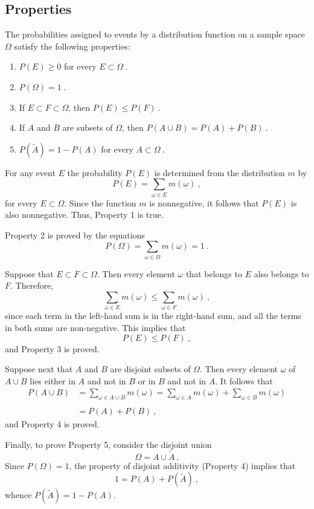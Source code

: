 

\subsection*{Properties}
\nopagebreak
\begin{theorem}\label{thm 1.1}
The probabilities assigned to events by a distribution function on a sample space
$\Omega$ 
satisfy the following properties: 
\begin{enumerate}
\item  $P(E) \geq 0$ for every $E \subset \Omega\ $.
\item  $P(\Omega) = 1\ $.
\item  If $E \subset F \subset \Omega$, then $P(E) \leq P(F)\ $.
\item  If $A$ and $B$ are  subsets of $\Omega$, then $P(A
\cup B)
= P(A) + P(B)\ $.
\item  $P(\tilde A) = 1 - P(A)$ for every $A \subset \Omega\ $.
\end{enumerate}
\proof
For any event $E$ the probability $P(E)$ is determined from the distribution $m$
by
$$
P(E) = \sum_{\omega \in E} m(\omega)\ ,
$$
for every $E \subset \Omega$.
Since the function $m$ is nonnegative, it follows that $P(E)$ is also
nonnegative.  Thus, Property 1 is true.  
\par
Property 2 is proved by the equations
$$
P(\Omega) = \sum_{\omega \in \Omega} m(\omega) = 1\ .
$$
\par
Suppose that $E \subset F \subset \Omega$.  Then every element $\omega$ that
belongs to $E$ also belongs to $F$.  Therefore,
$$
\sum_{\omega \in E} m(\omega) \leq \sum_{\omega \in F} m(\omega)\ ,
$$
since each term in the left-hand sum is in the right-hand sum, and all the terms 
in both sums are non-negative.  This implies that
$$P(E) \le P(F)\ ,$$
and Property 3 is proved.  
\par
Suppose next that $A$ and $B$ are disjoint subsets of
$\Omega$.  Then every element $\omega$ of $A \cup B$ lies either in $A$ and
not
in $B$ or in $B$ and not in $A$.  It follows that
$$\begin{array}{ll}
P(A \cup B) &= \sum_{\omega \in A \cup B} m(\omega) = \sum_{\omega \in A}
m(\omega) + \sum_{\omega \in B} m(\omega) \\
            &                             \\
            &= P(A) + P(B)\ ,
\end{array}
$$
and Property 4 is proved.  
\par
Finally, to prove Property 5, consider the disjoint union
$$
\Omega = A \cup \tilde A\ .
$$
Since $P(\Omega) = 1$, the property of disjoint additivity (Property 4) implies
that
$$
1 = P(A) + P(\tilde A)\ ,
$$
whence $P(\tilde A) = 1 - P(A)$.
\end{theorem}
